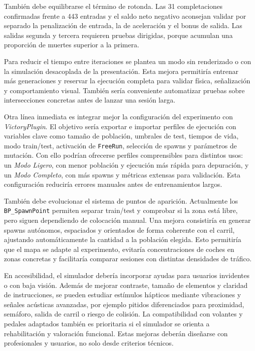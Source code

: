 También debe equilibrarse el término de rotonda. Las 31 completaciones confirmadas frente a 443 entradas y el saldo neto negativo aconsejan validar por separado la penalización de entrada, la de aceleración y el bonus de salida. Las salidas segunda y tercera requieren pruebas dirigidas, porque acumulan una proporción de muertes superior a la primera.

Para reducir el tiempo entre iteraciones se plantea un modo sin renderizado o con la simulación desacoplada de la presentación. Esta mejora permitiría entrenar más generaciones y reservar la ejecución completa para validar física, señalización y comportamiento visual. También sería conveniente automatizar pruebas sobre intersecciones concretas antes de lanzar una sesión larga.

Otra línea inmediata es integrar mejor la configuración del experimento con \textit{VictoryPlugin}. El objetivo sería exportar e importar perfiles de ejecución con variables clave como tamaño de población, umbrales de test, tiempos de vida, modo train/test, activación de \texttt{FreeRun}, selección de spawns y parámetros de mutación. Con ello podrían ofrecerse perfiles comprensibles para distintos usos: un \textit{Modo Ligero}, con menor población y ejecución más rápida para depuración, y un \textit{Modo Completo}, con más spawns y métricas extensas para validación. Esta configuración reduciría errores manuales antes de entrenamientos largos.

También debe evolucionar el sistema de puntos de aparición. Actualmente los \texttt{BP\_SpawnPoint} permiten separar train/test y comprobar si la zona está libre, pero siguen dependiendo de colocación manual. Una mejora consistiría en generar spawns autónomos, espaciados y orientados de forma coherente con el carril, ajustando automáticamente la cantidad a la población elegida. Esto permitiría que el mapa se adapte al experimento, evitaría concentraciones de coches en zonas concretas y facilitaría comparar sesiones con distintas densidades de tráfico.

En accesibilidad, el simulador debería incorporar ayudas para usuarios invidentes o con baja visión. Además de mejorar contraste, tamaño de elementos y claridad de instrucciones, se pueden estudiar estímulos hápticos mediante vibraciones y señales acústicas avanzadas, por ejemplo pitidos diferenciados para proximidad, semáforo, salida de carril o riesgo de colisión. La compatibilidad con volantes y pedales adaptados también es prioritaria si el simulador se orienta a rehabilitación y valoración funcional. Estas mejoras deberán diseñarse con profesionales y usuarios, no solo desde criterios técnicos.


